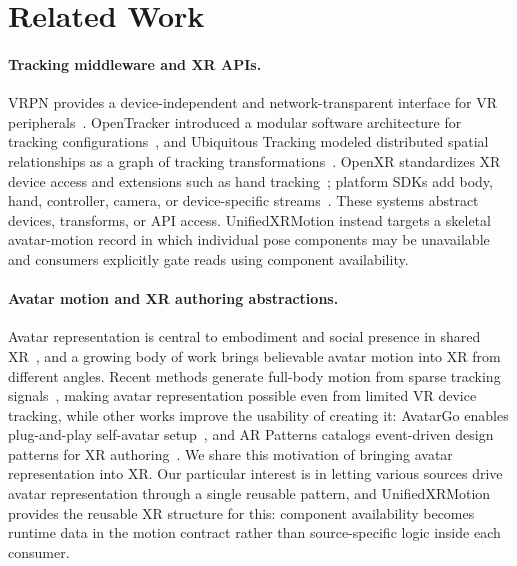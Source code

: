 \documentclass[runningheads]{llncs}
\newcommand{\radd}[1]{\textcolor{revadd}{#1}}
\newcommand{\radd}[1]{#1}
\begin{document}
\section{Related Work}\label{sec:related}
\paragraph{Tracking middleware and XR APIs.}
VRPN provides a device-independent and network-transparent interface for VR peripherals~\cite{taylor2001vrpn}. OpenTracker introduced a modular software architecture for tracking configurations~\cite{reitmayr2001openarchitecture}, and Ubiquitous Tracking modeled distributed spatial relationships as a graph of tracking transformations~\cite{newman2004ubiquitous}. OpenXR standardizes XR device access and extensions such as hand tracking~\cite{khronos_openxr_1_0,openxr_ext_hand}; platform SDKs add body, hand, controller, camera, or device-specific streams~\cite{meta_and_openxr_2025}. These systems abstract devices, transforms, or API access. UnifiedXRMotion instead targets a skeletal avatar-motion record in which individual pose components may be unavailable and consumers explicitly gate reads using component availability.

\paragraph{Avatar motion and XR authoring abstractions.}
\radd{
  Avatar representation is central to embodiment and social presence in shared XR~\cite{yun2023animationfidelity,baker2021avatar,weidner2023avatarsagents}, and a growing body of work brings believable avatar motion into XR from different angles.
  Recent methods generate full-body motion from sparse tracking signals~\cite{jiang2022avatarposer,dai2024hmd,yang2021lobstr,starke2024categorical}, making avatar representation possible even from limited VR device tracking, while other works improve the usability of creating it: AvatarGo enables plug-and-play self-avatar setup~\cite{ponton2022avatargo}, and AR Patterns catalogs event-driven design patterns for XR authoring~\cite{ackermann2023arpatterns}.
  We share this motivation of bringing avatar representation into XR.
  Our particular interest is in letting various sources drive avatar representation through a single reusable pattern, and UnifiedXRMotion provides the reusable XR structure for this: component availability becomes runtime data in the motion contract rather than source-specific logic inside each consumer.
}
\end{document}

